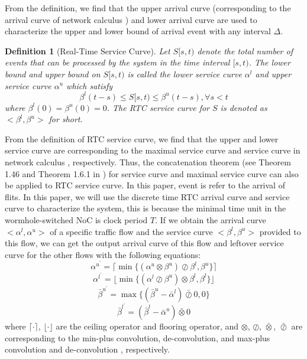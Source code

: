 \documentclass[10pt,journal]{IEEEtran}
\newtheorem{definition}{Definition}
\begin{document}
From the definition, we find that the upper arrival curve (corresponding to the arrival curve of network calculus \cite{Boudec2001Network}) and lower arrival curve are used to characterize the upper and lower bound of arrival event with any interval $\Delta$.

\begin{definition}[Real-Time Service Curve]
Let $S[s,t)$ denote the total number of events that can be processed by the system in the time interval $[s,t)$. The lower bound and upper bound on $S[s,t)$ is called the lower service curve $\alpha^l$ and upper service curve $\alpha^u$ which satisfy
$$\beta^l(t-s)\leq S[s,t)\leq \beta^u(t-s),\forall s<t$$
where $\beta^l(0)=\beta^u(0)=0$. The RTC service curve for $S$ is denoted as $<\beta^l,\beta^u>$ for short.
\end{definition}

From the definition of RTC service curve, we find that the upper and lower service curve are corresponding to the maximal service curve and service curve in network calculus \cite{Boudec2001Network}, respectively. Thus, the concatenation theorem (see Theorem 1.46 and Theorem 1.6.1 in \cite{Boudec2001Network}) for service curve and maximal service curve can also be applied to RTC service curve. In this paper, event is refer to the arrival of flits. In this paper, we will use the discrete time RTC arrival curve and service curve to characterize the system, this is because the minimal time unit in the wormhole-switched NoC is clock period $T$. If we obtain the arrival curve $<\alpha^l,\alpha^u>$ of a specific traffic flow and the service curve $<\beta^l,\beta^u>$ provided to this flow, we can get the output arrival curve of this flow and leftover service curve for the other flows with the following equations:
\begin{equation}\label{alphau}
\alpha^{u^\prime}=\lceil\min\{(\alpha^u\otimes\beta^u)\oslash\beta^l,\beta^u\}\rceil
\end{equation}
\begin{equation}\label{alphal}
\alpha^{l^\prime}=\lfloor\min\{(\alpha^l\oslash\beta^u)\otimes\beta^l,\beta^l\}\rfloor
\end{equation}
\begin{equation}\label{betau}
\bar{\beta}^{u^\prime}=\max\{(\bar{\beta}^u-\bar{\alpha}^l)\bar{\oslash}0,0\}
\end{equation}
\begin{equation}\label{betal}
\bar{\beta}^{l^\prime}=(\bar{\beta}^l-\bar{\alpha}^u)\bar{\otimes}0
\end{equation}
where $\lceil\cdot\rceil$, $\lfloor\cdot\rfloor$ are the ceiling operator and flooring operator, and $\otimes$, $\oslash$, $\bar{\otimes}$, $\bar{\oslash}$ are corresponding to the min-plus convolution, de-convolution, and max-plus convolution and de-convolution \cite{Boudec2001Network}, respectively.
\end{document}
